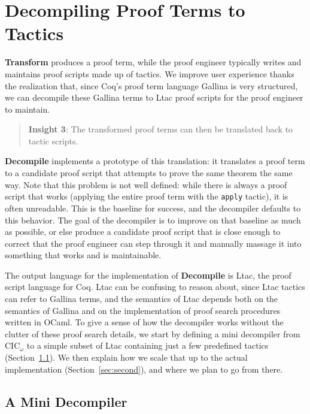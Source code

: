 \section{Decompiling Proof Terms to Tactics}
\label{sec:decompiler}

\textbf{Transform} produces a proof term,
while the proof engineer typically writes and maintains proof scripts made up of tactics.
We improve user experience thanks the realization that, since Coq's proof term language Gallina is very structured,
we can decompile these Gallina terms to Ltac proof scripts for the proof engineer to maintain.

\begin{quote}
\textbf{Insight 3}: The transformed proof terms can then be translated back to tactic scripts.
\end{quote}

\textbf{Decompile} implements a prototype of this translation:
it translates a proof term to a candidate proof script that attempts to prove the same theorem the same way.
Note that this problem is not well defined: while there is always a proof script that 
works (applying the entire proof term with the \lstinline{apply} tactic), it is often unreadable.
This is the baseline for success, and the decompiler defaults to this behavior.
The goal of the decompiler is to improve on that baseline as much as possible,
or else produce a candidate proof script that is close enough to correct that the proof engineer can step through it
and manually massage it into something that works and is maintainable.

The output language for the implementation of \textbf{Decompile} is Ltac, the proof script language for Coq.
Ltac can be confusing to reason about, since Ltac tactics can refer to Gallina terms, and the semantics of Ltac depends both on the
semantics of Gallina and on the implementation of proof search procedures written in OCaml.
To give a sense of how the decompiler works without the clutter of these proof search details, we start by defining a mini
decompiler from CIC$_{\omega}$ to a simple subset of Ltac containing just a few predefined tactics (Section~\ref{sec:first}).
We then explain how we scale that up to the actual implementation (Section~\ref{sec:second}), and where we plan to go from there.

\subsection{A Mini Decompiler}
\label{sec:first}

